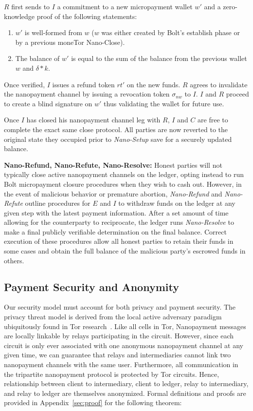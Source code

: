 $R$ first sends to $I$ a commitment to a new micropayment wallet $w'$ and a
zero-knowledge proof of the following statements:

\begin{enumerate}
\item $w'$ is well-formed from $w$ ($w$ was either created by Bolt's establish
  phase or by a previous moneTor Nano-Close).
\item The balance of $w'$ is equal to the sum of the balance from the previous
  wallet $w$ and $\delta * k$.
\end{enumerate}

Once verified, $I$ issues a refund token $rt'$ on the new funds. $R$ agrees to
invalidate the nanopayment channel by issuing a revocation token $\sigma_{nw}$
to $I$. $I$ and $R$ proceed to create a blind signature on $w'$ thus validating
the wallet for future use.

Once $I$ has closed his nanopayment channel leg with $R$, $I$ and $C$ are free
to complete the exact same close protocol. All parties are now reverted to the
original state they occupied prior to \emph{Nano-Setup} save for a securely
updated balance.

\medskip
\noindent\textbf{Nano-Refund, Nano-Refute, Nano-Resolve:} Honest parties will not
typically close active nanopayment channels on the ledger, opting instead to run
Bolt micropayment closure procedures when they wish to cash out. However, in the
event of malicious behavior or premature abortion, \emph{Nano-Refund} and
\emph{Nano-Refute} outline procedures for $E$ and $I$ to withdraw funds on the
ledger at any given step with the latest payment information. After a set amount
of time allowing for the counterparty to reciprocate, the ledger runs
\emph{Nano-Resolve} to make a final publicly verifiable determination on the
final balance. Correct execution of these procedures allow all honest parties to
retain their funds in some cases and obtain the full balance of the malicious
party's escrowed funds in others.

\subsection{Payment Security and Anonymity}
\label{subsec:paysecurity}
Our security model must account for both privacy and payment security. The
privacy threat model is derived from the local active adversary paradigm
ubiquitously found in Tor research~\cite{dingledine2004tor}. Like all cells in
Tor, Nanopayment messages are locally linkable by relays participating in the
circuit. However, since each circuit is only ever associated with one anonymous
nanopayment channel at any given time, we can guarantee that relays and
intermediaries cannot link two nanopayment channels with the same user.
Furthermore, all communication in the tripartite nanopayment protocol is
protected by Tor circuits. Hence, relationship between client to intermediary,
client to ledger, relay to intermediary, and relay to ledger are themselves
anonymized. Formal definitions and proofs are provided in
Appendix~\ref{sec:proof} for the following theorem:

